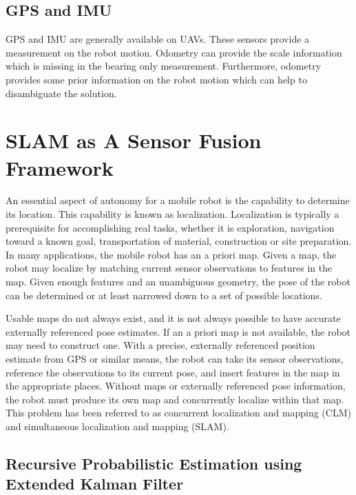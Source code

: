 \subsection{GPS and IMU}\label{sec:gps_and_imu}
GPS and IMU are generally available on UAVs. These sensors provide a 
measurement on the robot motion. Odometry can provide the scale 
information which is missing in the bearing only measurement. 
Furthermore, odometry provides some prior information on the robot 
motion which can help to disambiguate the solution.

\section{SLAM as A Sensor Fusion Framework}
\label{sec:SLAM}
An essential aspect of autonomy for a mobile robot is the capability to 
determine its location. This capability is known as localization. 
Localization is typically a prerequisite for accomplishing real tasks, 
whether it is exploration, navigation toward a known goal, 
transportation of material, construction or site preparation. In many 
applications, the mobile robot has an a priori map. Given a map, the 
robot may localize by matching current sensor observations to features 
in the map. Given enough features and an unambiguous geometry, the pose 
of the robot can be determined or at least narrowed down to a set of 
possible locations.

Usable maps do not always exist, and it is not always possible to have 
accurate externally referenced pose estimates. If an a priori map is not 
available, the robot may need to construct one. With a precise, 
externally referenced position estimate from GPS or similar means, the 
robot can take its sensor observations, reference the observations to 
its current pose, and insert features in the map in the appropriate 
places. Without maps or externally referenced pose information, the 
robot must produce its own map and concurrently localize within that 
map. This problem has been referred to as concurrent localization and 
mapping (CLM) and simultaneous localization and mapping (SLAM).

\subsection{Recursive Probabilistic Estimation using Extended Kalman Filter}
\label{sec:SLAM_using_EKF}

